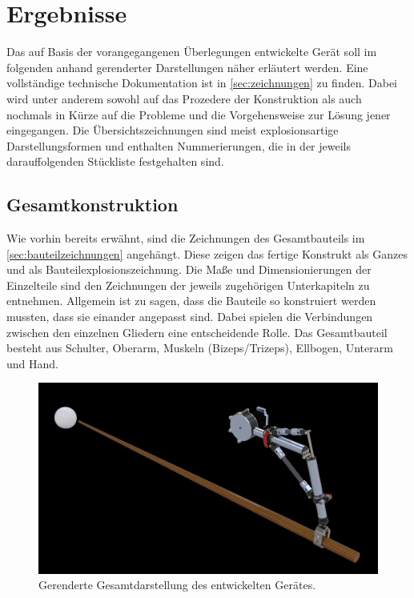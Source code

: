 \chapter{Ergebnisse}
	Das auf Basis der vorangegangenen Überlegungen entwickelte Gerät soll im folgenden anhand gerenderter Darstellungen näher erläutert werden.
	Eine vollständige technische Dokumentation ist in \cref{sec:zeichnungen} zu finden.
	Dabei wird unter anderem sowohl auf das Prozedere der Konstruktion als auch nochmals in Kürze auf die Probleme und die Vorgehensweise zur Lösung jener eingegangen.
	Die Übersichtszeichnungen sind meist explosionsartige Darstellungsformen und enthalten Nummerierungen, die in der jeweils darauffolgenden Stückliste festgehalten sind.
		
	\section{Gesamtkonstruktion}
		Wie vorhin bereits erwähnt, sind die Zeichnungen des Gesamtbauteils im \cref{sec:bauteilzeichnungen} angehängt.
		Diese zeigen das fertige Konstrukt als Ganzes und als Bauteilexplosionszeichnung.
		Die Maße und Dimensionierungen der Einzelteile sind den Zeichnungen der jeweils zugehörigen Unterkapiteln zu entnehmen.
		Allgemein ist zu sagen, dass die Bauteile so konstruiert werden mussten, dass sie einander angepasst sind.
		Dabei spielen die Verbindungen zwischen den einzelnen Gliedern eine entscheidende Rolle.
		Das Gesamtbauteil besteht aus Schulter, Oberarm, Muskeln (Bizeps/Trizeps), Ellbogen, Unterarm und Hand.
		\begin{figure}[h]
			\centering
			\includegraphics[width=\textwidth]{Abb/CAD/Renderings/master_render.jpg}
			\caption[Gerenderte Gesamtdarstellung des entwickelten Gerätes]{Gerenderte Gesamtdarstellung des entwickelten Gerätes.}%
			\label{fig:rendering total}
		\end{figure}
	
